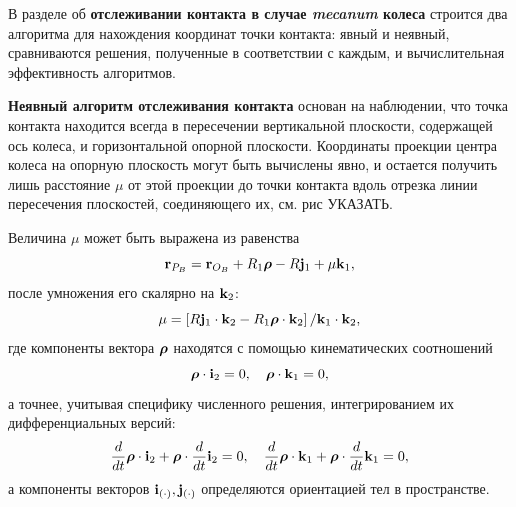 В разделе об \textbf{отслеживании контакта в случае \textit{mecanum} колеса} строится два алгоритма для нахождения координат точки контакта: явный и неявный, сравниваются решения, полученные в соответствии с каждым, и вычислительная эффективность алгоритмов.

%
\textbf{Неявный алгоритм отслеживания контакта} основан на наблюдении, что точка контакта находится всегда в пересечении вертикальной плоскости, содержащей ось колеса, и горизонтальной опорной плоскости. Координаты проекции центра колеса на опорную плоскость могут быть вычислены явно, и остается получить лишь расстояние $\mu$ от этой проекции до точки контакта вдоль отрезка линии пересечения плоскостей, соединяющего их, см. рис УКАЗАТЬ.

Величина $\mu$ может быть выражена из равенства
$$
{\bf r}_{P_B}={\bf r}_{O_B}+R_1\boldsymbol{\mathbf{\rho}} -R{\bf j}_1+\mu {\bf k}_1,
$$
после умножения его скалярно на ${\bf k}_2$:
$$
\mu =\left[R{\bf j}_1\cdot{\bf k}_2-R_1{\boldsymbol{\mathbf{\rho}} }\cdot {\bf k}_2\right] /
{\bf k}_1\cdot{\bf k}_2,
$$
где компоненты вектора $\boldsymbol{\mathbf{\rho}}$ находятся с помощью кинематических соотношений
$$
\boldsymbol{\mathbf{\rho}}\cdot {\bf i}_2=0,\quad\boldsymbol{\mathbf{\rho}}\cdot {\bf k}_1=0,
$$
а точнее, учитывая специфику численного решения, интегрированием их дифференциальных версий:
$$
\dfrac{d}{dt}\boldsymbol{\mathbf{\rho}}\cdot {\bf i}_2+\boldsymbol{\mathbf{\rho}}\cdot\dfrac{d}{dt}{\bf i}_2=0,\quad
\dfrac{d}{dt}\boldsymbol{\mathbf{\rho}}\cdot {\bf k}_1+\boldsymbol{\mathbf{\rho}}\cdot\dfrac{d}{dt}{\bf k}_1=0,
$$
а компоненты векторов ${\bf i}_{(\cdot)},{\bf j}_{(\cdot)}$ определяются ориентацией тел в пространстве.

